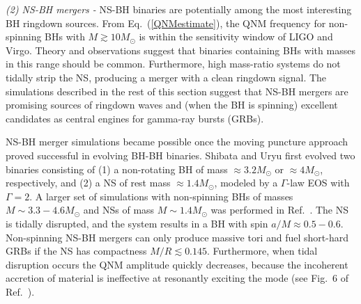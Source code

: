\documentclass[]{iopart}
\begin{document}
\noindent
{\it (2) NS-BH mergers -} 
%
NS-BH binaries are potentially among the most interesting BH ringdown
sources. From Eq.~(\ref{QNMestimate}), the QNM frequency for non-spinning BHs
with $M\gtrsim 10M_\odot$ is within the sensitivity window of LIGO and
Virgo. Theory and observations
\cite{Belczynski:2007xg,Remillard:2006fc,Silverman:2008ss} suggest that
binaries containing BHs with masses in this range should be
common. Furthermore, high mass-ratio systems do not tidally strip the NS,
producing a merger with a clean ringdown signal. The simulations described in
the rest of this section suggest that NS-BH mergers are promising sources of
ringdown waves and (when the BH is spinning) excellent candidates as central
engines for gamma-ray bursts (GRBs).

NS-BH merger simulations became possible once the moving puncture approach
\cite{Campanelli:2005dd,Baker:2005vv} proved successful in evolving BH-BH
binaries.  Shibata and Uryu \cite{Shibata:2006bs,Shibata:2006ks} first evolved
two binaries consisting of (1) a non-rotating BH of mass $\approx 3.2M_\odot$
or $\approx 4M_\odot$, respectively, and (2) a NS of rest mass $\approx
1.4M_\odot$, modeled by a $\Gamma$-law EOS with $\Gamma=2$. A larger set of
simulations with non-spinning BHs of masses $M\sim 3.3-4.6M_\odot$ and NSs of
mass $M\sim 1.4M_\odot$ was performed in Ref.~\cite{Shibata:2007zm}. The NS is
tidally disrupted, and the system results in a BH with spin $a/M\approx
0.5-0.6$. Non-spinning NS-BH mergers can only produce massive tori and fuel
short-hard GRBs if the NS has compactness $M/R\lesssim 0.145$. Furthermore,
when tidal disruption occurs the QNM amplitude quickly decreases, because the
incoherent accretion of material is ineffective at resonantly exciting the
mode (see Fig.~6 of Ref.~\cite{Shibata:2007zm}).
\end{document}

